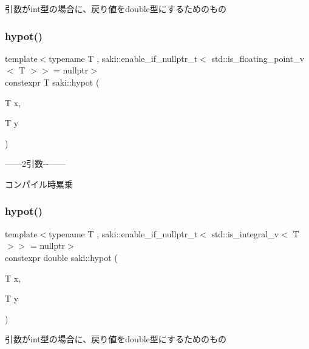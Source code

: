 引数がint型の場合に、戻り値をdouble型にするためのもの 

\mbox{\label{namespacesaki_a0dfe75bfa0e5223a0390c5e2941e69bc}} 
\subsubsection{\texorpdfstring{hypot()}{hypot()}\hspace{0.1cm}{\footnotesize\ttfamily [1/6]}}
{\footnotesize\ttfamily template$<$typename T , saki\+::enable\+\_\+if\+\_\+nullptr\+\_\+t$<$ std\+::is\+\_\+floating\+\_\+point\+\_\+v$<$ T $>$$>$  = nullptr$>$ \\
constexpr T saki\+::hypot (\begin{DoxyParamCaption}\item[{T}]{x,  }\item[{T}]{y }\end{DoxyParamCaption})}



------2引数-\/-\/------ 

コンパイル時累乗 \mbox{\label{namespacesaki_ad888da163ba5c006d664d564fb48f7a7}} 
\subsubsection{\texorpdfstring{hypot()}{hypot()}\hspace{0.1cm}{\footnotesize\ttfamily [2/6]}}
{\footnotesize\ttfamily template$<$typename T , saki\+::enable\+\_\+if\+\_\+nullptr\+\_\+t$<$ std\+::is\+\_\+integral\+\_\+v$<$ T $>$$>$  = nullptr$>$ \\
constexpr double saki\+::hypot (\begin{DoxyParamCaption}\item[{T}]{x,  }\item[{T}]{y }\end{DoxyParamCaption})}



引数がint型の場合に、戻り値をdouble型にするためのもの 

\mbox{\label{namespacesaki_ae2b457ea76e5aedc8279d8c78a07b26b}} 
